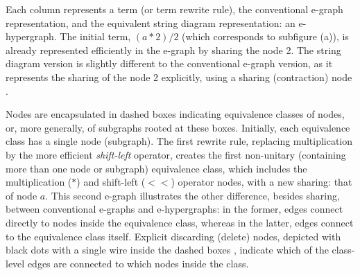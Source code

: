 Each column represents a term (or term rewrite rule), the conventional e-graph representation, and the equivalent string diagram representation: an e-hypergraph. 
The initial term, $(a*2)/2$ (which corresponds to subfigure (a)), is already represented efficiently in the e-graph by sharing the node 2.
The string diagram version is slightly different to the conventional e-graph version, as it represents the sharing of the node 2 explicitly, using a sharing (contraction) node
. 

Nodes are encapsulated in dashed boxes indicating equivalence classes of nodes, or, more generally, of subgraphs rooted at these boxes.
Initially, each equivalence class has a single node (subgraph).
The first rewrite rule, replacing multiplication by the more efficient \emph{shift-left} operator, creates the first non-unitary (containing more than one node or subgraph) equivalence class, which includes the multiplication ($*$) and shift-left ($<\!\!<$) operator nodes, with a new sharing: that of node $a$.
This second e-graph illustrates the other difference, besides sharing, between conventional e-graphs and e-hypergraphs: in the former, edges connect directly to nodes inside the equivalence class, whereas in the latter, edges connect to the equivalence class itself.
Explicit discarding (delete) nodes, depicted with black dots with a single wire inside the dashed boxes 
, indicate which of the class-level edges are connected to which nodes inside the class.

